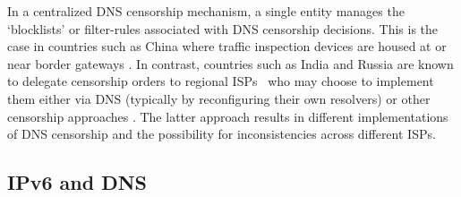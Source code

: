 In a centralized DNS censorship mechanism, a single entity manages the
`blocklists' or filter-rules associated with DNS censorship decisions. This is
the case in countries such as China where traffic inspection devices are housed
at or near border gateways \cite{xu2011internet}. In contrast, countries such
as India and Russia are known to delegate censorship orders to regional
ISPs~\cite{Gosain2017a}
who may choose to implement them either via DNS (typically by reconfiguring
their own resolvers) or other censorship approaches
\cite{ramesh2020decentralized, Yadav2018a, singh2020india}. The latter approach results in
different implementations of DNS censorship and the possibility for
inconsistencies across different ISPs.

% 
\subsection{IPv6 and DNS} \label{sec:background:ipv6}

